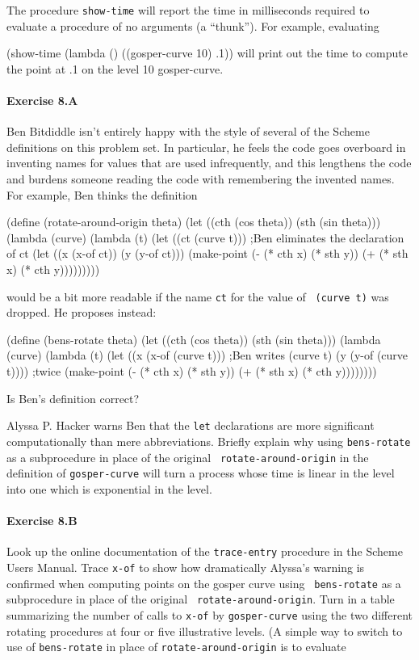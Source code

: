 The procedure {\tt show-time} will report the time in milliseconds
required to evaluate a procedure of no arguments (a ``thunk'').  For
example, evaluating

\beginlisp
(show-time (lambda () ((gosper-curve 10) .1))
\endlisp
will print out the time to compute the point at .1 on the level 10 gosper-curve.

\medskip

\paragraph{Exercise 8.A}
Ben Bitdiddle isn't entirely happy with the style of several of the Scheme
definitions on this problem set. In particular, he feels the code goes
overboard in inventing names for values that are used infrequently, and
this lengthens the code and burdens someone reading the code with
remembering the invented names.  For example, Ben thinks the definition

\beginlisp
(define (rotate-around-origin theta)
  (let ((cth (cos theta))
        (sth (sin theta)))
    (lambda (curve)
      (lambda (t)
        (let ((ct (curve t)))      ;Ben eliminates the declaration of ct
          (let ((x (x-of ct))
                (y (y-of ct)))
            (make-point
             (- (* cth x) (* sth y))
             (+ (* sth x) (* cth y)))))))))
\endlisp

would be a bit more readable if the name {\tt ct} for the value of {\tt
(curve t)} was dropped.  He proposes instead:

\beginlisp
(define (bens-rotate theta)
  (let ((cth (cos theta))
        (sth (sin theta)))
    (lambda (curve)
      (lambda (t)
        (let ((x (x-of (curve t)))      ;Ben writes (curve t)
              (y (y-of (curve t))))     ;twice
          (make-point
           (- (* cth x) (* sth y))
           (+ (* sth x) (* cth y))))))))
\endlisp

Is Ben's definition correct?

Alyssa P. Hacker warns Ben that the {\tt let} declarations are more
significant computationally than mere abbreviations.  Briefly explain why
using {\tt bens-rotate} as a subprocedure in place of the original {\tt
rotate-around-origin} in the definition of {\tt gosper-curve} will turn a
process whose time is linear in the level into one which is exponential in
the level.

\paragraph{Exercise 8.B}
Look up the online documentation of the {\tt trace-entry} procedure in the
Scheme Users Manual.  Trace {\tt x-of} to show how dramatically Alyssa's
warning is confirmed when computing points on the gosper curve using {\tt
bens-rotate} as a subprocedure in place of the original {\tt
rotate-around-origin}.  Turn in a table summarizing the number of calls to
{\tt x-of} by {\tt gosper-curve} using the two different rotating
procedures at four or five illustrative levels.  (A simple way to switch
to use of {\tt bens-rotate} in place of {\tt rotate-around-origin} is to
evaluate

